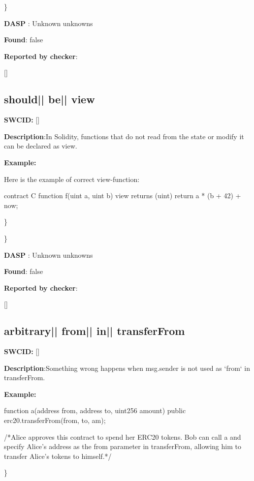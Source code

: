 \documentclass{article}
\begin{document}
\} 

\textbf{DASP} : Unknown unknowns

\textbf{Found}: false

\textbf{Reported by checker}: 
\begin{ffcode} 

[]
\end{ffcode} 
\subsection{should{|\textunderscore| }be{|\textunderscore| }view} 
\textbf{SWC{\textunderscore }ID:} []

\textbf{Description}:In Solidity, functions that do not read from the state or modify it can be declared as view.


\textbf{Example:} 
\begin{ffcode} 

Here is the example of correct view-function:

contract C {
    function f(uint a, uint b) view returns (uint) {
        return a * (b + 42) + now;
    }
}

\end{ffcode} 
\} 

\} 

\textbf{DASP} : Unknown unknowns

\textbf{Found}: false

\textbf{Reported by checker}: 
\begin{ffcode} 

[]
\end{ffcode} 
\subsection{arbitrary{|\textunderscore| }from{|\textunderscore| }in{|\textunderscore| }transferFrom} 
\textbf{SWC{\textunderscore }ID:} []

\textbf{Description}:Something wrong happens when msg.sender is not used as `from` in transferFrom.


\textbf{Example:} 
\begin{ffcode} 

function a(address from, address to, uint256 amount) public {
  erc20.transferFrom(from, to, am);
}

 /*Alice approves this contract to spend her ERC20 tokens. Bob can call a and specify Alice's address as the from parameter in transferFrom, allowing him to transfer Alice's tokens to himself.*/ 

\end{ffcode} 
\} 
\end{document}
